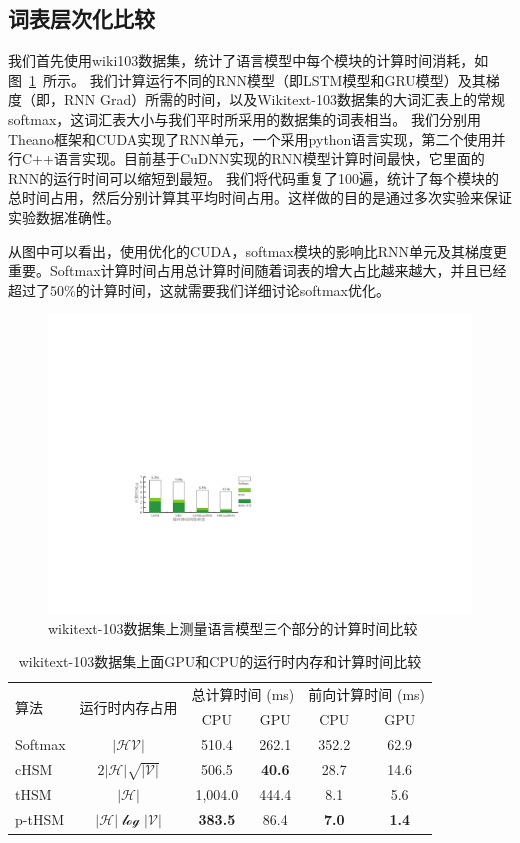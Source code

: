 \subsection{词表层次化比较}
我们首先使用wiki103数据集，统计了语言模型中每个模块的计算时间消耗，如图~\ref{fig:rnn_timing}~所示。 我们计算运行不同的RNN模型（即LSTM模型和GRU模型）及其梯度（即，RNN Grad）所需的时间，以及Wikitext-103数据集的大词汇表上的常规softmax，这词汇表大小与我们平时所采用的数据集的词表相当。 我们分别用Theano框架和CUDA实现了RNN单元，一个采用python语言实现，第二个使用并行C++语言实现。目前基于CuDNN实现的RNN模型计算时间最快，它里面的RNN的运行时间可以缩短到最短。 我们将代码重复了100遍，统计了每个模块的总时间占用，然后分别计算其平均时间占用。这样做的目的是通过多次实验来保证实验数据准确性。

从图中可以看出，使用优化的CUDA，softmax模块的影响比RNN单元及其梯度更重要。Softmax计算时间占用总计算时间随着词表的增大占比越来越大，并且已经超过了$50\%$的计算时间，这就需要我们详细讨论softmax优化。
\begin{figure}[!ht]
  \centering
  \includegraphics[width=0.8\columnwidth]{./figures/rnn_timing.pdf}
  \caption{wikitext-103数据集上测量语言模型三个部分的计算时间比较}\label{fig:rnn_timing}
\end{figure}


\begin{table}[!ht]
  \centering
  \caption{wikitext-103数据集上面GPU和CPU的运行时内存和计算时间比较\label{tab:time}}
\begin{tabular}{lccccc}
  \toprule
 \multirow{2}{*}{算法}  &\multirow{2}{*}{运行时内存占用} &\multicolumn{2}{c}{总计算时间 (ms)} & \multicolumn{2}{c}{前向计算时间 (ms)}   \\
   \cmidrule(lr){3-4}  \cmidrule(lr){5-6}
	& & CPU&GPU & CPU& GPU \\ \midrule
Softmax & $\mathcal{|HV|}$ &510.4  &262.1&352.2& 62.9 \\
cHSM    & $2\mathcal{|H|\sqrt{|V|}}$&506.5  &\textbf{40.6}&28.7&14.6 \\
tHSM    &$\mathcal{|H|}$&1,004.0 &444.4 & 8.1&  5.6   \\
p-tHSM  &$\mathcal{|H|\log{|V|}}$ &\textbf{383.5}&	86.4 &\textbf{7.0}&	\textbf{1.4} \\
  \bottomrule
\end{tabular}
\end{table}


